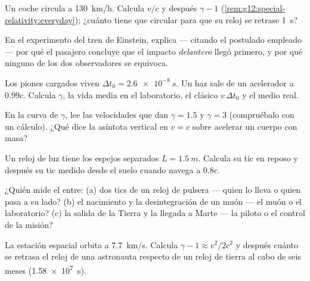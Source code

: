 \begin{exercise}[$\star$]\label{exo:g12:special-relativity:4}
Un coche circula a \qty{130}{km/h}. Calcula $v/c$ y después $\gamma - 1$
(\cref{rem:g12:special-relativity:everyday}); ¿cuánto tiene que circular para que su
reloj se retrase \qty{1}{s}?
\end{exercise}

\begin{exercise}[$\star$]\label{exo:g12:special-relativity:5}
En el experimento del tren de Einstein, explica --- citando el postulado empleado ---
por qué el pasajero concluye que el impacto \emph{delantero} llegó primero, y por qué
ninguno de los dos observadores se equivoca.
\end{exercise}

\begin{exercise}[$\star\star$]\label{exo:g12:special-relativity:6}
Los piones cargados viven $\Delta t_0 = \qty{2.6e-8}{s}$. Un haz sale de un acelerador
a $0.99c$. Calcula $\gamma$, la vida media en el laboratorio, el  clásico
$v\,\Delta t_0$ y el  medio real.
\end{exercise}

\begin{exercise}[$\star\star$]\label{exo:g12:special-relativity:7}
En la curva de $\gamma$, lee las velocidades que dan $\gamma = 1.5$ y $\gamma = 3$
(compruébalo con un cálculo). ¿Qué dice la asíntota vertical en $v = c$ sobre acelerar
un cuerpo con masa?
\end{exercise}

\begin{exercise}[$\star\star$]\label{exo:g12:special-relativity:8}
Un reloj de luz tiene los espejos separados $L = \qty{1.5}{m}$. Calcula su tic en
reposo y después su tic medido desde el suelo cuando navega a $0.8c$.
\end{exercise}

\begin{exercise}[$\star\star$]\label{exo:g12:special-relativity:9}
¿Quién mide el  entre: (a) dos tics de un reloj de pulsera --- quien lo
lleva o quien pasa a su lado? (b) el nacimiento y la desintegración de un muón --- el
muón o el laboratorio? (c) la salida de la Tierra y la llegada a Marte --- la piloto o
el control de la misión?
\end{exercise}

\begin{exercise}[$\star\star$]\label{exo:g12:special-relativity:10}
La estación espacial orbita a \qty{7.7}{km/s}. Calcula
$\gamma - 1 \approx v^2/2c^2$ y después cuánto se retrasa el reloj de una astronauta
respecto de un reloj de tierra al cabo de seis meses (\qty{1.58e7}{s}).
\end{exercise}

